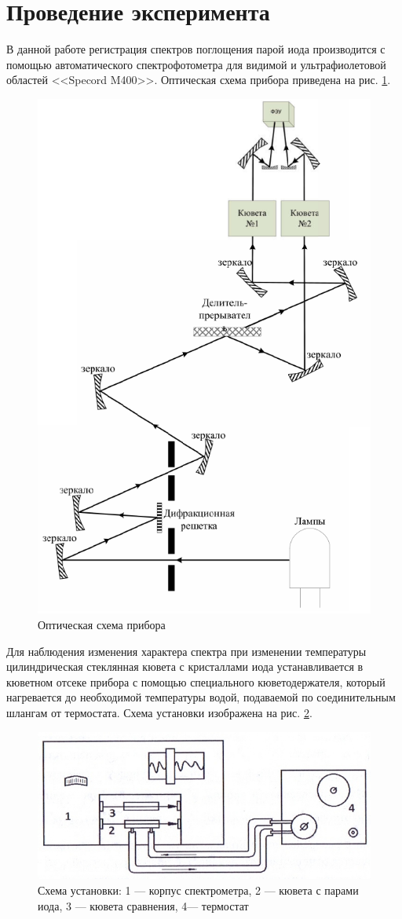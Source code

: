 \section{Проведение эксперимента}
В данной работе регистрация спектров поглощения парой иода производится с помощью автоматического спектрофотометра для видимой и ультрафиолетовой областей <<Specord M400>>. Оптическая схема прибора приведена на рис. \ref{fig:ust}.

\begin{figure}[h!]
\centering
\includegraphics[width=0.6\linewidth]{ust.png}
\caption{Оптическая схема прибора}
\label{fig:ust}
\end{figure}

Для наблюдения изменения характера спектра при изменении температуры цилиндрическая стеклянная кювета с кристаллами иода устанавливается в кюветном отсеке прибора с помощью специального кюветодержателя, который нагревается до необходимой температуры водой, подаваемой по соединительным шлангам от термостата. Схема установки изображена на рис. \ref{fig:ust1}.

\begin{figure}[h!]
	\centering
	\includegraphics[width=0.4\linewidth]{ust1}
	\caption{Схема установки: 1 --- корпус спектрометра, 2 --- кювета с парами иода, 3 --- кювета сравнения, 4--- термостат}
	\label{fig:ust1}
\end{figure}

